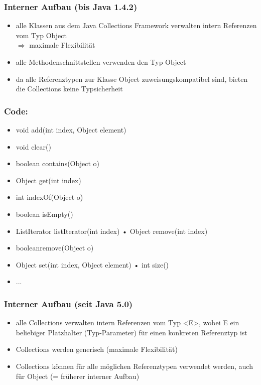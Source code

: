 \documentclass[a4paper,10pt]{article}
\begin{document}
\subsubsection{Interner Aufbau (bis Java 1.4.2)}
\begin{itemize}
	\item alle Klassen aus dem Java Collections Framework verwalten intern Referenzen vom Typ Object \\ $\Rightarrow$ maximale Flexibilität
	\item alle Methodenschnittstellen verwenden den Typ Object
	\item da alle Referenztypen zur Klasse Object zuweisungskompatibel sind, bieten die Collections keine Typsicherheit
\end{itemize}

\subsubsection*{Code:}
\begin{itemize}
	\item void add(int index, Object element)
	\item void clear()
	\item boolean contains(Object o)
	\item Object get(int index)
	\item  int indexOf(Object o)
	\item boolean isEmpty()
	\item ListIterator listIterator(int index) • Object remove(int index)
	\item booleanremove(Object o)
	\item Object set(int index, Object element) • int size()
	\item ...
\end{itemize}

\subsubsection{Interner Aufbau (seit Java 5.0)}
\begin{itemize}
	\item alle Collections verwalten intern Referenzen vom Typ <E>, wobei E ein beliebiger Platzhalter (Typ-Parameter) für einen konkreten Referenztyp ist
	\item Collections werden generisch (maximale Flexibilität)
	\item Collections können für alle möglichen Referenztypen verwendet werden, auch
für Object (= früherer interner Aufbau)
\end{itemize}
\end{document}
